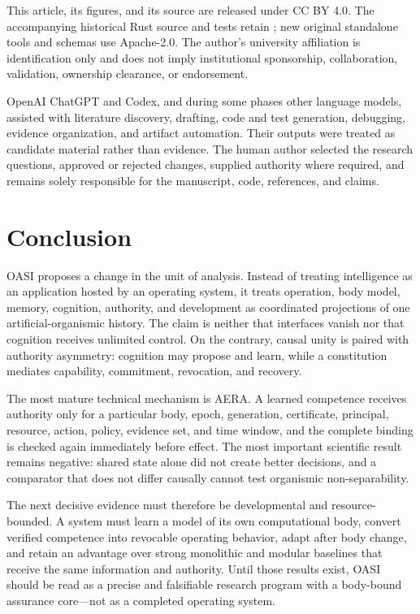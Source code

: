 \documentclass[journal,10pt]{IEEEtran}
\newcommand{\OASI}{\textsc{OASI}}
\newcommand{\AERA}{\textsc{AERA}}
\newcommand{\Code}[1]{\texttt{\detokenize{#1}}}
\begin{document}
This article, its figures, and its source are released under CC BY 4.0. The accompanying historical Rust source and tests retain \Code{Apache-2.0 OR MIT}; new original standalone tools and schemas use Apache-2.0. The author's university affiliation is identification only and does not imply institutional sponsorship, collaboration, validation, ownership clearance, or endorsement.

OpenAI ChatGPT and Codex, and during some phases other language models, assisted with literature discovery, drafting, code and test generation, debugging, evidence organization, and artifact automation. Their outputs were treated as candidate material rather than evidence. The human author selected the research questions, approved or rejected changes, supplied authority where required, and remains solely responsible for the manuscript, code, references, and claims.

\section{Conclusion}
\OASI{} proposes a change in the unit of analysis. Instead of treating intelligence as an application hosted by an operating system, it treats operation, body model, memory, cognition, authority, and development as coordinated projections of one artificial-organismic history. The claim is neither that interfaces vanish nor that cognition receives unlimited control. On the contrary, causal unity is paired with authority asymmetry: cognition may propose and learn, while a constitution mediates capability, commitment, revocation, and recovery.

The most mature technical mechanism is \AERA{}. A learned competence receives authority only for a particular body, epoch, generation, certificate, principal, resource, action, policy, evidence set, and time window, and the complete binding is checked again immediately before effect. The most important scientific result remains negative: shared state alone did not create better decisions, and a comparator that does not differ causally cannot test organismic non-separability.

The next decisive evidence must therefore be developmental and resource-bounded. A system must learn a model of its own computational body, convert verified competence into revocable operating behavior, adapt after body change, and retain an advantage over strong monolithic and modular baselines that receive the same information and authority. Until those results exist, \OASI{} should be read as a precise and falsifiable research program with a body-bound assurance core---not as a completed operating system.
\end{document}
